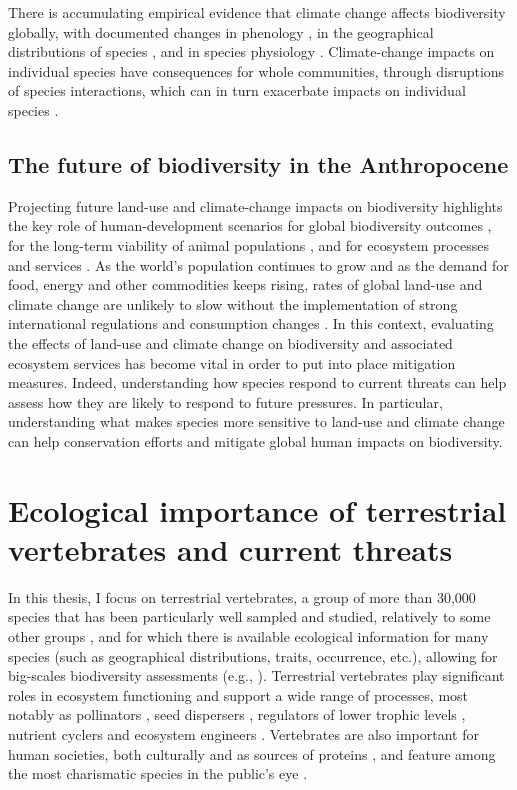 There is accumulating empirical evidence that climate change affects biodiversity globally, with documented changes in phenology \citep{Inouye2022}, in the geographical distributions of species \citep{Chen2011, Lenoir2015, Soroye2020}, and in species physiology \citep{Portner2008, Chown2010}.  Climate-change impacts on individual species have consequences for whole communities, through disruptions of species interactions, which can in turn exacerbate impacts on individual species \citep{Cahill2013, Kharouba2018}. 


\subsection{The future of biodiversity in the Anthropocene}

Projecting  future land-use and climate-change impacts on biodiversity highlights the key role of human-development scenarios for global biodiversity outcomes \citep{Newbold2018}, for the long-term viability of animal populations \citep{Spooner2018}, and for ecosystem processes and services \citep{Lawler2014}. As the world’s population continues to grow and as the demand for food, energy and other commodities keeps rising, rates of global land-use and climate change are unlikely to slow without the implementation of strong international regulations and consumption changes \citep{IPCC2022, Stehfest2019}. In this context, evaluating the effects of land-use and climate change on biodiversity and associated ecosystem services has become vital in order to put into place mitigation measures. Indeed, understanding how species respond to current threats can help assess how they are likely to respond to future pressures. In particular, understanding what makes species more sensitive to land-use and climate change can help conservation efforts and mitigate global human impacts on biodiversity. 


\section{Ecological importance of terrestrial vertebrates and current threats}

In this thesis, I focus on terrestrial vertebrates, a group of more than 30,000 species that has been particularly well sampled and studied, relatively to some other groups \citep{Titley2017}, and for which there is available ecological information for many species (such as geographical distributions, traits, occurrence, etc.), allowing for big-scales biodiversity assessments (e.g., \citet{Jenkins2013}). Terrestrial vertebrates  play significant roles in ecosystem functioning and support a wide range of processes, most notably as pollinators \citep{Ratto2018}, seed dispersers \citep{Tiffney2004}, regulators of lower trophic levels \citep{Barber2010, Salo2010, Luck2012, Lin2018, Zhang2018_trophicinter}, nutrient cyclers \citep{Wilson2011, Inger2016, Cunningham2018} and ecosystem engineers \citep{Severtsov2012}. Vertebrates are also important for human societies, both culturally and as sources of proteins \citep{Hirons2016, Albert2018, Alves2018}, and feature among the most charismatic species in the public’s eye \citep{Courchamp2018, Albert2018}.

